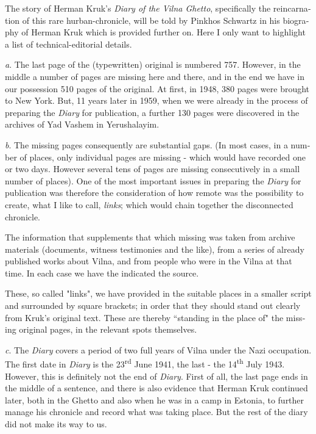 \documentclass{article}
\begin{document}
\begin{pairs}
\begin{Leftside}
\begin{english}
The story of Herman Kruk's \emph{Diary of the Vilna Ghetto}, specifically the reincarnation 
of this rare hurban-chronicle,
will be told by Pinkhos Schwartz in his biography of Herman Kruk which is provided further on. 
Here I only want to highlight a list of technical-editorial details.

\emph{a}. The last page of the  (typewritten) original is numbered 757. However, in the middle a number of pages are missing here and there,
and in the end we have in our possession 510 pages of the original.
At first, in 1948, 380 pages were brought to New York. But, 11 years later in 1959, 
when we were already in the process of preparing the \emph{Diary} for publication, a further 130 pages were discovered in the archives of Yad Vashem in Yerushalayim.

\emph{b}. The missing pages consequently are substantial gaps. (In most cases, in a number of places, only individual pages are missing - which would have recorded one or two days. 
However several tens of pages are missing consecutively in a small number of places). 
One of the most important issues in preparing the \emph{Diary} for publication was
therefore the consideration of how remote was the possibility to create, what I like to call, \emph{links};
which would chain together the disconnected chronicle.

The information that supplements that which missing was taken from archive materials 
(documents, witness testimonies and the like), from a series of already published works
about Vilna, and from people who were in the Vilna at that time. In each case we have the
indicated the source.
 
These, so called "links", we have provided in the suitable places in a smaller
script and surrounded by square brackets; in order that they should stand out clearly from 
Kruk's original text. 
These are thereby ``standing in the place of" the missing original pages, in the relevant spots themselves.

\emph{c}. The \emph{Diary} covers a period of two full years of Vilna under the Nazi occupation.
The first date in \emph{Diary} is the 23\textsuperscript{rd} June 1941, the last - the 14\textsuperscript{th}
July 1943. However, this is definitely not the end of \emph{Diary}. First of all, the 
last page ends in the middle of a sentence, and there is also evidence that
Herman Kruk continued later, both in the Ghetto and also when he was in a camp in Estonia,
to further manage his chronicle and record what was taking place. But the rest of the diary
did not make its way to us.


\end{english}
\end{Leftside}
\end{pairs}
\end{document}
